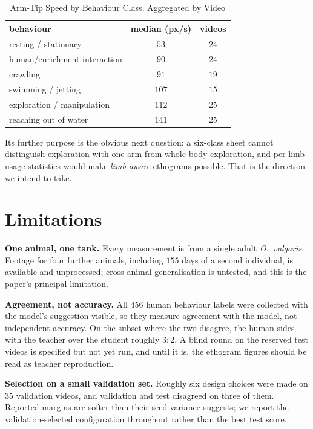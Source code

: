 \documentclass[conference]{IEEEtran}
\begin{document}
\begin{table}[t]\centering
\caption{Arm-Tip Speed by Behaviour Class, Aggregated by Video}
\label{tab:kin}
\small
\begin{tabular}{@{}lcc@{}}
\toprule
behaviour & median (px/s) & videos \\
\midrule
resting / stationary          & $53$  & $24$ \\
human/enrichment interaction  & $90$  & $24$ \\
crawling                      & $91$  & $19$ \\
swimming / jetting            & $107$ & $15$ \\
exploration / manipulation    & $112$ & $25$ \\
reaching out of water         & $141$ & $25$ \\
\bottomrule
\end{tabular}
\end{table}

Its further purpose is the obvious next question: a six-class sheet cannot
distinguish exploration with one arm from whole-body exploration, and per-limb
usage statistics would make \emph{limb-aware} ethograms possible. That is the
direction we intend to take.

\section{Limitations}
\label{sec:limits}
\textbf{One animal, one tank.} Every measurement is from a single adult
\emph{O.\ vulgaris}. Footage for four further animals, including $155$ days of a
second individual, is available and unprocessed; cross-animal generalisation is
untested, and this is the paper's principal limitation.

\textbf{Agreement, not accuracy.} All $456$ human behaviour labels were collected
with the model's suggestion visible, so they measure agreement with the model, not
independent accuracy. On the subset where the two disagree, the human sides with
the teacher over the student roughly $3{:}2$. A blind round on the reserved test
videos is specified but not yet run, and until it is, the ethogram figures should
be read as teacher reproduction.

\textbf{Selection on a small validation set.} Roughly six design choices were
made on $35$ validation videos, and validation and test disagreed on three of
them. Reported margins are softer than their seed variance suggests; we report
the validation-selected configuration throughout rather than the best test score.
\end{document}
